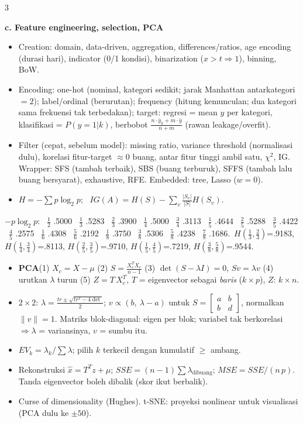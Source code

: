 \documentclass[8pt]{extarticle}
\newcommand{\sect}[1]{\par\vspace{1.5pt}\colorbox{black!12}{\parbox{\dimexpr\columnwidth-2\fboxsep}{\textbf{#1}}}\par\vspace{0.8pt}}
\newcommand{\sub}[1]{\textbf{#1}\;}
\begin{document}
\begin{multicols*}{3}
\sect{c. Feature engineering, selection, PCA}
\begin{itemize}
\item Creation: domain, data-driven, aggregation, differences/ratios, age encoding (durasi hari), indicator (0/1 kondisi), binarization ($x>t\Rightarrow1$), binning, BoW.
\item Encoding: one-hot (nominal, kategori sedikit; jarak Manhattan antarkategori $=2$); label/ordinal (berurutan); frequency (hitung kemunculan; dua kategori sama frekuensi tak terbedakan); target: regresi = mean $y$ per kategori, klasifikasi = $P(y{=}1|k)$, berbobot $\frac{n\cdot\bar y_k+m\cdot\bar y}{n+m}$ (rawan leakage/overfit).
\item Filter (cepat, sebelum model): missing ratio, variance threshold (normalisasi dulu), korelasi fitur-target $\approx0$ buang, antar fitur tinggi ambil satu, $\chi^2$, IG. Wrapper: SFS (tambah terbaik), SBS (buang terburuk), SFFS (tambah lalu buang bersyarat), exhaustive, RFE. Embedded: tree, Lasso ($w=0$).
\item $H=-\sum p\log_2p$; \ $IG(A)=H(S)-\sum_v\frac{|S_v|}{|S|}H(S_v)$.
\end{itemize}
\textbf{$-p\log_2p$}: \ $\tfrac12$ .5000 \ $\tfrac13$ .5283 \ $\tfrac23$ .3900 \ $\tfrac14$ .5000 \ $\tfrac34$ .3113 \ $\tfrac15$ .4644 \ $\tfrac25$ .5288 \ $\tfrac35$ .4422 \ $\tfrac45$ .2575 \ $\tfrac16$ .4308 \ $\tfrac56$ .2192 \ $\tfrac18$ .3750 \ $\tfrac38$ .5306 \ $\tfrac58$ .4238 \ $\tfrac78$ .1686.\ $H(\tfrac13,\tfrac23)$=.9183, $H(\tfrac14,\tfrac34)$=.8113, $H(\tfrac25,\tfrac35)$=.9710, $H(\tfrac15,\tfrac45)$=.7219, $H(\tfrac38,\tfrac58)$=.9544.
\begin{itemize}
\item \sub{PCA}(1) $X_c=X-\mu$ (2) $S=\frac{X_c^TX_c}{n-1}$ (3) $\det(S-\lambda I)=0$, $Sv=\lambda v$ (4) urutkan $\lambda$ turun (5) $Z=T\,X_c^T$, $T$ = eigenvector sebagai \emph{baris} ($k\times p$), $Z$: $k\times n$.
\item $2\times2$: $\lambda=\frac{tr\pm\sqrt{tr^2-4\det}}{2}$; $v\propto(b,\ \lambda-a)$ untuk $S=\begin{bmatrix}a&b\\b&d\end{bmatrix}$, normalkan $\|v\|=1$. Matriks blok-diagonal: eigen per blok; variabel tak berkorelasi $\Rightarrow\lambda$ = variansinya, $v$ = sumbu itu.
\item $EV_k=\lambda_k/\sum\lambda$; pilih $k$ terkecil dengan kumulatif $\ge$ ambang.
\item Rekonstruksi $\hat x=T^Tz+\mu$; $SSE=(n-1)\sum\lambda_{\text{dibuang}}$; $MSE=SSE/(n\,p)$. Tanda eigenvector boleh dibalik (skor ikut berbalik).
\item Curse of dimensionality (Hughes). t-SNE: proyeksi nonlinear untuk visualisasi (PCA dulu ke $\pm50$).
\end{itemize}


\end{multicols*}
\end{document}
